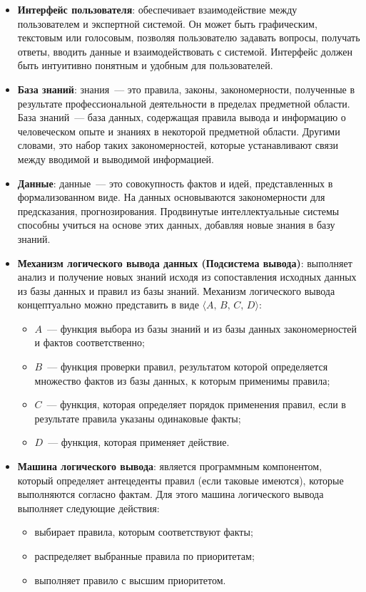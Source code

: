 \documentclass[a4paper,final]{article}
\begin{document}
\begin{itemize}
	\item \textbf{Интерфейс пользователя}: обеспечивает взаимодействие между пользователем и экспертной системой. Он может быть графическим, текстовым или голосовым, позволяя пользователю задавать вопросы, получать ответы, вводить данные и взаимодействовать с системой. Интерфейс должен быть интуитивно понятным и удобным для пользователей.

	\item \textbf{База знаний}: знания~--- это правила, законы, закономерности, полученные в результате профессиональной деятельности в пределах предметной области. База знаний~--- база данных, содержащая правила вывода и информацию о человеческом опыте и знаниях в некоторой предметной области. Другими словами, это набор таких закономерностей, которые устанавливают связи между вводимой и выводимой информацией.

	\item \textbf{Данные}: данные~--- это совокупность фактов и идей, представленных в формализованном виде. На данных основываются закономерности для предсказания, прогнозирования. Продвинутые интеллектуальные системы способны учиться на основе этих данных, добавляя новые знания в базу знаний.

	\item \textbf{Механизм логического вывода данных (Подсистема вывода)}: выполняет анализ и получение новых знаний исходя из сопоставления исходных данных из базы данных и правил из базы знаний. Механизм логического вывода концептуально можно представить в виде $\langle A,\,B,\,C,\,D \rangle$:
	\begin{itemize}
		\item $A$~--- функция выбора из базы знаний и из базы данных закономерностей и фактов соответственно;
		\item $B$~--- функция проверки правил, результатом которой определяется множество фактов из базы данных, к которым применимы правила;
		\item $C$~--- функция, которая определяет порядок применения правил, если в результате правила указаны одинаковые факты;
		\item $D$~--- функция, которая применяет действие.
	\end{itemize}

	\item \textbf{Машина логического вывода}: является программным компонентом, который определяет антецеденты правил (если таковые имеются), которые выполняются согласно фактам. Для этого машина логического вывода выполняет следующие действия:
	\begin{itemize}
		\item выбирает правила, которым соответствуют факты;
		\item распределяет выбранные правила по приоритетам;
		\item выполняет правило с высшим приоритетом.
	\end{itemize}


\end{itemize}
\end{document}
